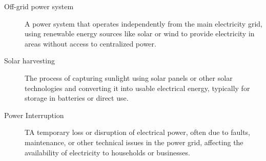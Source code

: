{\begin{description}
	\item[Off-grid power system] 
	A power system that operates independently from the main electricity grid, using renewable energy sources like solar or wind to provide electricity in areas without access to centralized power.
	
	\item[Solar harvesting] 
	The process of capturing sunlight using solar panels or other solar technologies and converting it into usable electrical energy, typically for storage in batteries or direct use.
	
	\item[Power Interruption] 
	TA temporary loss or disruption of electrical power, often due to faults, maintenance, or other technical issues in the power grid, affecting the availability of electricity to households or businesses.



\end{description}

}
